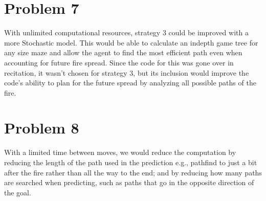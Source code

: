 \documentclass[12pt]{report}
\begin{document}
\section{Problem 7}
With unlimited computational resources, strategy 3 could be improved with a more Stochastic model. This would be able to calculate an indepth game tree for any size maze and allow the agent to find the most efficient path even when accounting for future fire spread. Since the code for this was gone over in recitation, it wasn't chosen for strategy 3, but its inclusion would improve the code's ability to plan for the future spread by analyzing all possible paths of the fire.

\section{Problem 8}
With a limited time between moves, we would reduce the computation by reducing the length of the path used in the prediction e.g., pathfind to just a bit after the fire rather than all the way to the end; and by reducing how many paths are searched when predicting, such as paths that go in the opposite direction of the goal.
\end{document}
